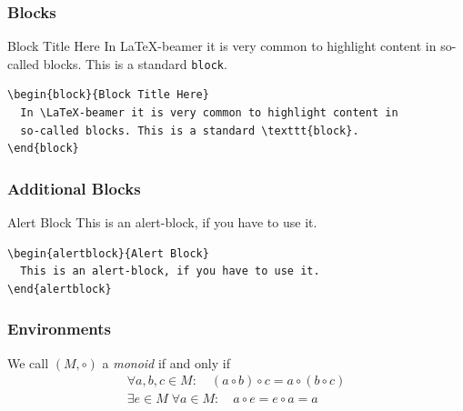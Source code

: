 \documentclass[aspectratio=169]{beamer}
\begin{document}

\begin{frame}[fragile]
\frametitle{Blocks}

\begin{block}{Block Title Here}
In \LaTeX-beamer it is very common to highlight content in so-called blocks. This is a standard \texttt{block}.
\end{block}

\begin{verbatim}
\begin{block}{Block Title Here}
  In \LaTeX-beamer it is very common to highlight content in 
  so-called blocks. This is a standard \texttt{block}.
\end{block} 
\end{verbatim}
\end{frame}


\begin{frame}[fragile]
\frametitle{Additional Blocks}
\begin{alertblock}{Alert Block}
	This is an alert-block, if you have to use it.
\end{alertblock}

\begin{verbatim}
\begin{alertblock}{Alert Block}
  This is an alert-block, if you have to use it.
\end{alertblock}
\end{verbatim}
\end{frame}


\begin{frame}
\frametitle{Environments}

\begin{definition}[Monoid]
 We call $(M,\circ)$ a \emph{monoid} if and only if
 \begin{gather*}
  \forall a,b,c\in M:\quad(a\circ b)\circ c = a\circ(b\circ c) \tag{associativity}\\
  \exists e\in M \;\forall a\in M:\quad a\circ e= e\circ a= a \tag{neutral element}
 \end{gather*}
\end{definition}

\end{frame}
\end{document}
